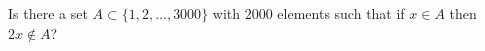 Is there a set $A \subset \{1, 2, \ldots, 3000\}$ with $2000$ elements such that if $x \in A$ then $2x \notin A$?
